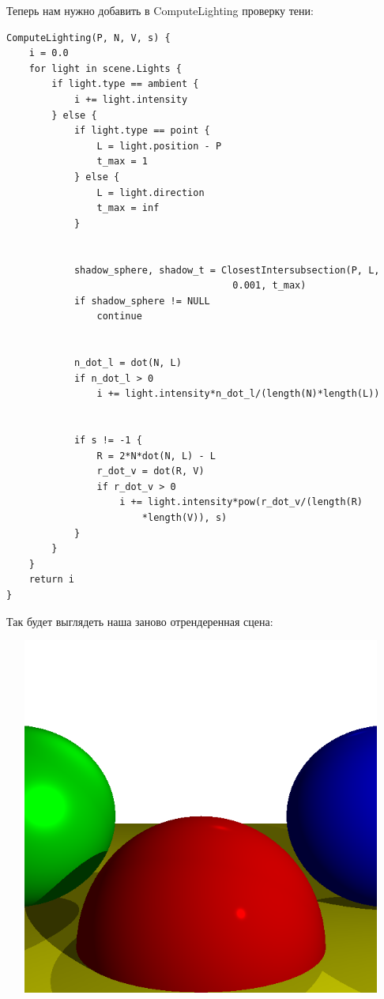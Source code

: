 Теперь нам нужно добавить в ComputeLighting проверку тени:

\begin{lstlisting}
ComputeLighting(P, N, V, s) {
    i = 0.0
    for light in scene.Lights {
        if light.type == ambient {
            i += light.intensity
        } else {
            if light.type == point {
                L = light.position - P
                t_max = 1
            } else {
                L = light.direction
                t_max = inf
            }

            
            shadow_sphere, shadow_t = ClosestIntersubsection(P, L, 
                                        0.001, t_max)
            if shadow_sphere != NULL
                continue

            
            n_dot_l = dot(N, L)
            if n_dot_l > 0
                i += light.intensity*n_dot_l/(length(N)*length(L))

            
            if s != -1 {
                R = 2*N*dot(N, L) - L
                r_dot_v = dot(R, V)
                if r_dot_v > 0
                    i += light.intensity*pow(r_dot_v/(length(R)
                        *length(V)), s)
            }
        }
    }
    return i
}
\end{lstlisting}

Так будет выглядеть наша заново отрендеренная сцена:

\includegraphics[width=13cm, height=11.8cm]{shadows4.png}

